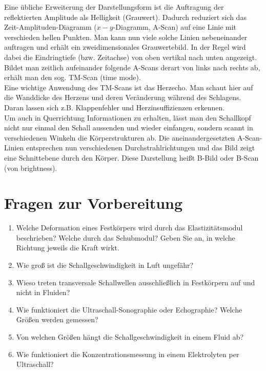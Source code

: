 \noindent
Eine übliche Erweiterung der Darstellungsform ist die Auftragung der reflektierten Amplitude als Helligkeit (Grauwert). Dadurch reduziert sich das Zeit-Amplituden-Diagramm ($x-y$-Diagramm, A-Scan) auf eine Linie mit verschieden hellen Punkten. Man kann nun viele solche Linien nebeneinander auftragen und erhält ein zweidimensionales Grauwertebild. In der Regel wird dabei die Eindringtiefe (bzw. Zeitachse) von oben vertikal nach unten angezeigt. Bildet man zeitlich aufeinander folgende A-Scans derart von links nach rechts ab, erhält man den sog. TM-Scan
(time mode).\\
Eine wichtige Anwendung des TM-Scans ist das Herzecho. Man schaut hier auf die Wanddicke des Herzens und deren Veränderung während des Schlagens. Daran lassen sich z.B. Klappenfehler und Herzinsuffizienzen erkennen.\\

\noindent
Um auch in Querrichtung Informationen zu erhalten, lässt man den Schallkopf nicht nur einmal den Schall aussenden und wieder einfangen, sondern scannt in verschiedenen Winkeln die Körperstrukturen ab. Die aneinandergesetzten A-Scan-Linien entsprechen nun verschiedenen Durchstrahlrichtungen und das Bild zeigt eine Schnittebene durch den Körper. Diese Darstellung heißt B-Bild oder B-Scan (von
brightness).

\section{Fragen zur Vorbereitung}

\begin{enumerate} 
	\item Welche Deformation eines Festkörpers wird durch das Elastizitätsmodul beschrieben? Welche durch das Schubmodul? Geben Sie an, in welche Richtung jeweils die Kraft wirkt.
	\item Wie groß ist die Schallgeschwindigkeit in Luft ungefähr?
	\item Wieso treten transversale Schallwellen ausschließlich in Festkörpern auf und nicht in Fluiden?
	\item Wie funktioniert die Ultraschall-Sonographie oder Echographie? Welche Größen werden gemessen?
	\item Von welchen Größen hängt die Schallgeschwindigkeit in einem Fluid ab?
	\item Wie funktioniert die Konzentrationsmessung in einem Elektrolyten per Ultraschall? 
\end{enumerate} 

